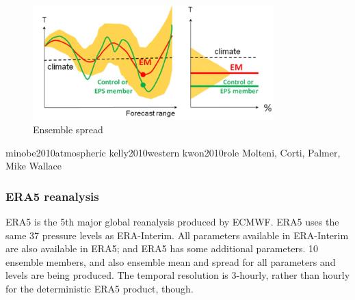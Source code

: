 %	

\begin{figure}
	
	\includegraphics[width=22pc,angle=0]{ens_spread.png}
	\caption{Ensemble spread}\label{fig:ens_spread}
	\centering
\end{figure}

minobe2010atmospheric
kelly2010western
kwon2010role
Molteni, Corti, Palmer, Mike Wallace



\subsubsection {ERA5 reanalysis}  \label{ECMWF_ERA5}
ERA5 is the 5th major global reanalysis produced by ECMWF.
ERA5 uses the same 37 pressure levels as ERA-Interim.
All parameters available in ERA-Interim are also available in ERA5; and ERA5 has some additional parameters.
10 ensemble members, and also ensemble mean and spread for all parameters and levels are being produced. The temporal resolution is 3-hourly, rather than hourly for the deterministic ERA5 product, though.

